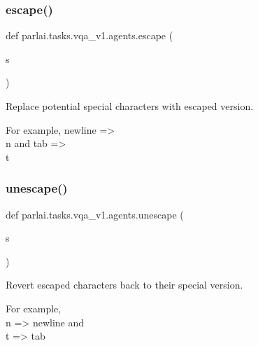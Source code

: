 \subsubsection{\texorpdfstring{escape()}{escape()}}
{\footnotesize\ttfamily def parlai.\+tasks.\+vqa\+\_\+v1.\+agents.\+escape (\begin{DoxyParamCaption}\item[{}]{s }\end{DoxyParamCaption})}

\begin{DoxyVerb}Replace potential special characters with escaped version.

For example, newline => \\n and tab => \\t
\end{DoxyVerb}
 \mbox{\label{namespaceparlai_1_1tasks_1_1vqa__v1_1_1agents_ab44e9835e0cedea3719e3baebfe0e94b}} 
\subsubsection{\texorpdfstring{unescape()}{unescape()}}
{\footnotesize\ttfamily def parlai.\+tasks.\+vqa\+\_\+v1.\+agents.\+unescape (\begin{DoxyParamCaption}\item[{}]{s }\end{DoxyParamCaption})}

\begin{DoxyVerb}Revert escaped characters back to their special version.

For example, \\n => newline and \\t => tab
\end{DoxyVerb}
 